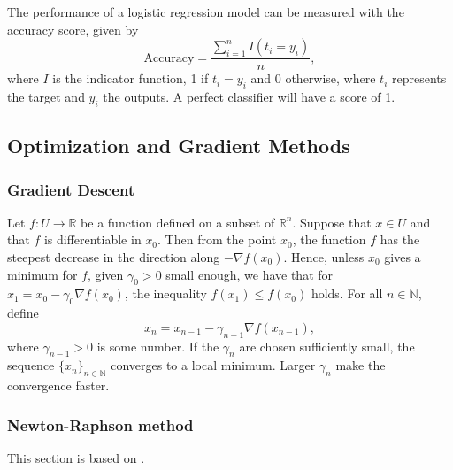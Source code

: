 The performance of a logistic regression model can be measured with the accuracy score, given by
\begin{equation}\label{eq:accuracy score}
    \text{Accuracy} = \frac{\sum_{i=1}^n I(t_i = y_i)}{n},
\end{equation}
where $I$ is the indicator function, 1 if $t_i = y_i$ and 0 otherwise, where $t_i$ represents the target and $y_i$ the outputs. A perfect classifier will have a score of 1.



\subsection{Optimization and Gradient Methods}\label{sec:optim theory}

\subsubsection{Gradient Descent}\label{sec:gradient descent}
Let $f\colon U\to\mathbb{R}$ be a function defined on a subset of $\mathbb{R}^n$. Suppose that $x\in U$ and that $f$ is differentiable in $x_0$. Then from the point $x_0$, the function $f$ has the steepest decrease in the direction along $-\nabla f(x_0)$. Hence, unless $x_0$ gives a minimum for $f$, given $\gamma_0 > 0$ small enough, we have that for $x_1 = x_0 - \gamma_0\nabla f(x_0)$, the inequality $f(x_1)\le f(x_0)$ holds. For all $n\in\mathbb{N}$, define
\begin{equation*}
    x_n = x_{n-1} - \gamma_{n-1}\nabla f(x_{n-1}),
\end{equation*}
where $\gamma_{n-1}>0$ is some number. If the $\gamma_{n}$ are chosen sufficiently small, the sequence $\{x_n\}_{n\in\mathbb{N}}$ converges to a local minimum. Larger $\gamma_{n}$ make the convergence faster.

\subsubsection{Newton-Raphson method}\label{sec:newton-raphson method}

This section is based on \cite[Section 5.6]{FVA}.

